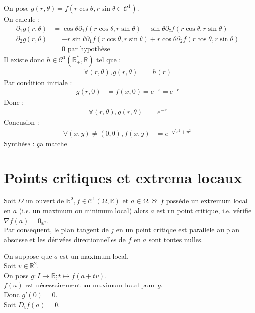 \documentclass[../main.tex]{subfiles}
\begin{document}
\noindent On pose $g(r, \theta) = f(r \cos \theta, r \sin \theta \in \mathcal{C}^1)$. \\
On calcule : 
\begin{align*}
    \partial_1 g(r, \theta) &= \cos\theta \partial_1 f(r \cos \theta, r \sin \theta) + \sin\theta \partial_2 f(r \cos \theta, r \sin \theta) \\
    \partial_2 g(r, \theta) &= -r \sin\theta \partial_1 f(r \cos \theta, r \sin \theta) + r \cos\theta \partial_2 f(r \cos \theta, r \sin \theta) \\
    &= 0 \text{ par hypothèse}
\end{align*}
Il existe donc $h\in \mathcal{C}^1(\mathbb{R}_+^*, \mathbb{R})$ tel que : 
\begin{align*}
    \forall (r, \theta), g(r, \theta) &= h(r)
\end{align*}
Par condition initiale : 
\begin{align*}
    g(r, 0) &= f(x, 0) = e^{-x} = e^{-r}
\end{align*}
Donc : 
\begin{align*}
    \forall (r, \theta), g(r, \theta) &= e^{-r}
\end{align*}
Concusion : 
\begin{align*}
    \forall (x, y)\neq (0, 0), f(x, y) &= e^{-\sqrt{x^2 + y^2}}
\end{align*}
\underline{Synthèse :} ça marche

\section{Points critiques et extrema locaux}
\begin{tcolorbox}[title=Théorème 36.51, title filled=false, colframe=orange, colback=orange!10!white]
    Soit $\Omega$ un ouvert de $\mathbb{R}^2, f \in \mathcal{C}^1(\Omega, \mathbb{R})$ et $a \in \Omega$. Si $f$ possède un extremum local en $a$ (i.e. un maximum ou minimum local) alors $a$ est un point critique, i.e. vérifie $\nabla f(a)=0_{\mathbb{R}^2}$. \\
    Par conséquent, le plan tangent de $f$ en un point critique est parallèle au plan abscisse et les dérivées directionnelles de $f$ en $a$ sont toutes nulles.
\end{tcolorbox}

\noindent On suppose que $a$ est un maximum local. \\
Soit $v\in \mathbb{R}^2$. \\
On pose $g:I\to \mathbb{R}; t\mapsto f(a + tv)$. \\
$f(a)$ est nécessairement un maximum local pour $g$. \\
Donc $g'(0) = 0$. \\
Soit $D_v f(a) = 0$. 
\end{document}
